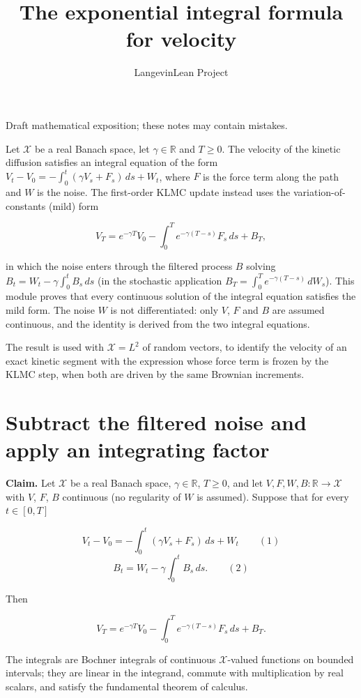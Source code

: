\documentclass[11pt,a4paper]{article}
\title{\texorpdfstring{The exponential integral formula for velocity}{The exponential integral formula for velocity}}
\author{LangevinLean Project}
\date{}
\begin{document}
\maketitle
Draft mathematical exposition; these notes may contain mistakes.


Let \(\mathcal X\) be a real Banach space, let \(\gamma\in\mathbb R\) and \(T\ge0\). The velocity of the kinetic diffusion satisfies an integral equation of the form \(V_t-V_0=-\int_0^t(\gamma V_s+F_s)\,ds+W_t\), where \(F\) is the force term along the path and \(W\) is the noise. The first-order KLMC update instead uses the variation-of-constants (mild) form


\[V_T=e^{-\gamma T}V_0-\int_0^Te^{-\gamma(T-s)}F_s\,ds+B_T,\]


in which the noise enters through the filtered process \(B\) solving \(B_t=W_t-\gamma\int_0^tB_s\,ds\) (in the stochastic application \(B_T=\int_0^Te^{-\gamma(T-s)}\,dW_s\)). This module proves that every continuous solution of the integral equation satisfies the mild form. The noise \(W\) is not differentiated: only \(V\), \(F\) and \(B\) are assumed continuous, and the identity is derived from the two integral equations.




The result is used with \(\mathcal X=L^2\) of random vectors, to identify the velocity of an exact kinetic segment with the expression whose force term is frozen by the KLMC step, when both are driven by the same Brownian increments.


\section{\texorpdfstring{Subtract the filtered noise and apply an integrating factor}{Subtract the filtered noise and apply an integrating factor}}


\textbf{Claim.} Let \(\mathcal X\) be a real Banach space, \(\gamma\in\mathbb R\), \(T\ge0\), and let \(V,F,W,B:\mathbb R\to\mathcal X\) with \(V\), \(F\), \(B\) continuous (no regularity of \(W\) is assumed). Suppose that for every \(t\in[0,T]\)


\[V_t-V_0=-\int_0^t(\gamma V_s+F_s)\,ds+W_t\qquad(1)\]
\[B_t=W_t-\gamma\int_0^tB_s\,ds.\qquad(2)\]


Then


\[V_T=e^{-\gamma T}V_0-\int_0^Te^{-\gamma(T-s)}F_s\,ds+B_T .\]


The integrals are Bochner integrals of continuous \(\mathcal X\)-valued functions on bounded intervals; they are linear in the integrand, commute with multiplication by real scalars, and satisfy the fundamental theorem of calculus.
\end{document}
